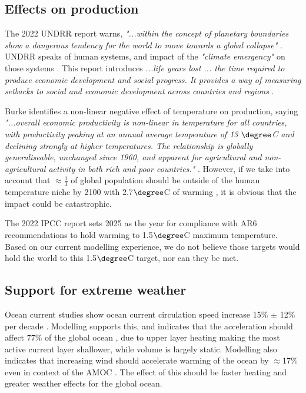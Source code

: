 \documentclass{article}
\begin{document}
\subsection{Effects on production} 
The 2022 UNDRR report warns, \emph{"...within the concept of planetary boundaries show a dangerous tendency for the world to move towards a global collapse"} \cite[pp. 51-52]{UNDRR2022OurWorldAtRisk}. UNDRR speaks of human systems, and impact of the \emph{"climate emergency"} on those systems \cite[pp.  ix, xiii, 41, 202, ]{UNDRR2022OurWorldAtRisk}. This report introduces \emph{...life years lost ... the time required to produce economic development and social progress. It provides a way of measuring setbacks to social and economic development across countries and regions} \cite[p. 34]{UNDRR2022OurWorldAtRisk}. 

Burke identifies a non-linear negative effect of temperature on production, saying \emph{"...overall economic productivity is non-linear in temperature for all countries, with productivity peaking at an annual average temperature of 13 $\degree$C and declining strongly at higher temperatures. The relationship is globally generaliseable, unchanged since 1960, and apparent for agricultural and non-agricultural activity in both rich and poor countries."}  \cite{Burke2015GlobalNonlinearEffectOfTemp}. However, if we take into account that $\approx \frac{1}{3}$ of global population should be outside of the human temperature niche by 2100 with 2.7$\degree$C of warming \cite{Lenton2023QuantifyingHumanCostOfGlobalWarming} , it is obvious that the impact could be catastrophic.

The 2022 IPCC report sets 2025 as the year for compliance with AR6 recommendations to hold warming to 1.5$\degree$C maximum temperature\cite[SPM-21]{IPCC_AR6_WG3_Report}. Based on our current modelling experience, we do not believe those targets would hold the  world to this 1.5$\degree$C target, nor can they be met.  

\subsection{Support for extreme weather}
 Ocean current studies  show ocean current circulation speed increase 15\% $\pm$ 12\% per decade \cite[p. 2 \& fig. 1]{Hu2020DeepAccelerationOfGlobalOceanCirculationOverPast2Decades}.  Modelling supports this, and indicates that the acceleration should affect 77\% of the global ocean \cite{Peng2022SurfaceWarmingInducedGlobalAccelerationOfUpperOceanCurrents}, due to upper layer heating making the most active current layer shallower, while volume is largely static.  Modelling also indicates that increasing wind should accelerate warming of the ocean by $\approx$17\% even in context of the AMOC \cite{McMonigal2023WindAccelerateWarming}. The effect of this should be faster heating and greater weather effects for the global ocean. 
\end{document}
